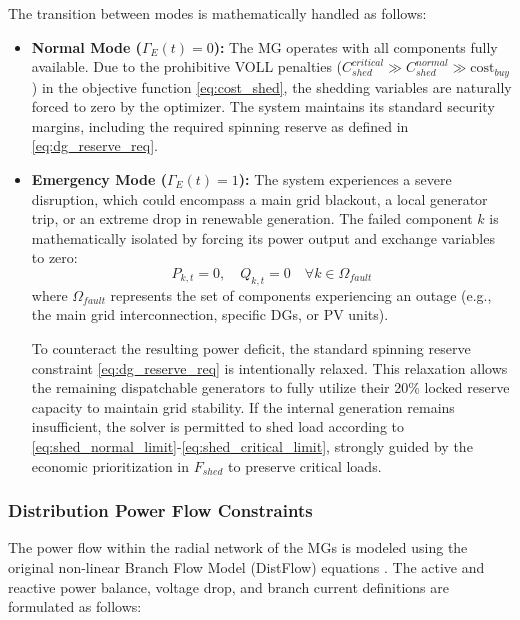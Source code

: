The transition between modes is mathematically handled as follows:

\begin{itemize}
    \item \textbf{Normal Mode ($\Gamma_E(t) = 0$):} The MG operates with all components fully available. Due to the prohibitive VOLL penalties ($C_{shed}^{critical} \gg C_{shed}^{normal} \gg \text{cost}_{buy}$) in the objective function \eqref{eq:cost_shed}, the shedding variables are naturally forced to zero by the optimizer. The system maintains its standard security margins, including the required spinning reserve as defined in \eqref{eq:dg_reserve_req}.

    \item \textbf{Emergency Mode ($\Gamma_E(t) = 1$):} The system experiences a severe disruption, which could encompass a main grid blackout, a local generator trip, or an extreme drop in renewable generation. The failed component $k$ is mathematically isolated by forcing its power output and exchange variables to zero:
    \begin{equation}
        P_{k,t} = 0, \quad Q_{k,t} = 0 \quad \forall k \in \Omega_{fault} \label{eq:fault_generic}
    \end{equation}
    where $\Omega_{fault}$ represents the set of components experiencing an outage (e.g., the main grid interconnection, specific DGs, or PV units). 
    
    To counteract the resulting power deficit, the standard spinning reserve constraint \eqref{eq:dg_reserve_req} is intentionally relaxed. This relaxation allows the remaining dispatchable generators to fully utilize their 20\% locked reserve capacity to maintain grid stability. If the internal generation remains insufficient, the solver is permitted to shed load according to \eqref{eq:shed_normal_limit}-\eqref{eq:shed_critical_limit}, strongly guided by the economic prioritization in $F_{shed}$ to preserve critical loads.
\end{itemize}


\subsubsection{Distribution Power Flow Constraints}
\label{subsubsec:distflow}

The power flow within the radial network of the MGs is modeled using the original non-linear Branch Flow Model (DistFlow) equations \cite{Chowdhury2023_SOCP_ThreePhase}. The active and reactive power balance, voltage drop, and branch current definitions are formulated as follows:

